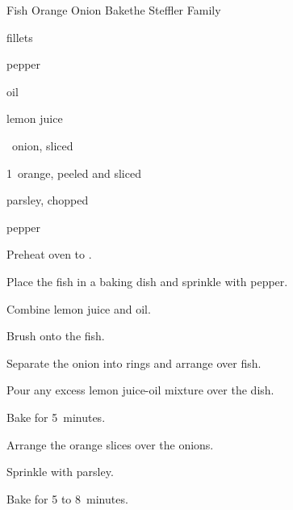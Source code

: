 \begin{recipe}{Fish Orange Onion Bake}{the Steffler Family}{}

\begin{ingredients}
\item \lbs{\half}  fillets
\item \tp{\quarter} pepper
\item {} oil
\item {} lemon juice
\item \half{}~onion, sliced 
\item 1~orange, peeled and sliced
\item {} parsley, chopped 
\item pepper
\end{ingredients}

\begin{directions}
\item Preheat oven to .
\item Place the fish in a baking dish and sprinkle with pepper.
\item Combine lemon juice and oil.
\item Brush onto the fish.
\item Separate the onion into rings and arrange over fish.
\item Pour any excess lemon juice-oil mixture over the dish.
\item Bake for 5~minutes.
\item Arrange the orange slices over the onions.
\item Sprinkle with parsley.
\item Bake for 5 to 8~minutes.
\end{directions}
\end{recipe}
